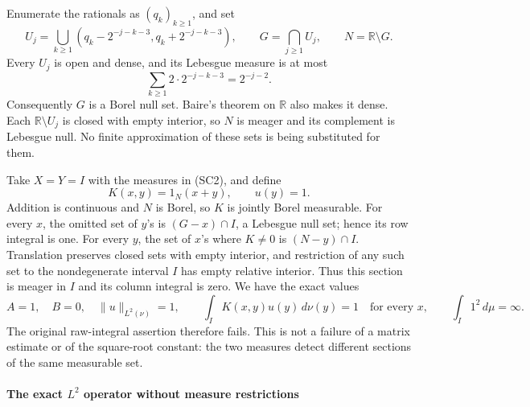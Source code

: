 \documentclass[
  11pt,
]{article}
\begin{document}
Enumerate the rationals as \((q_k)_{k\geq1}\), and set \[
 U_j=\bigcup_{k\geq1}
 (q_k-2^{-j-k-3},q_k+2^{-j-k-3}),\qquad
 G=\bigcap_{j\geq1}U_j,\qquad N=\mathbb R\setminus G .
 \tag{SC3}
\] Every \(U_j\) is open and dense, and its Lebesgue measure is at most
\[
 \sum_{k\geq1}2\cdot2^{-j-k-3}=2^{-j-2}.
 \tag{SC4}
\] Consequently \(G\) is a Borel null set. Baire's theorem on
\(\mathbb R\) also makes it dense. Each \(\mathbb R\setminus U_j\) is
closed with empty interior, so \(N\) is meager and its complement is
Lebesgue null. No finite approximation of these sets is being
substituted for them.

Take \(X=Y=I\) with the measures in (SC2), and define \[
 K(x,y)=1_N(x+y),\qquad u(y)=1 .
 \tag{SC5}
\] Addition is continuous and \(N\) is Borel, so \(K\) is jointly Borel
measurable. For every \(x\), the omitted set of \(y\)'s is
\((G-x)\cap I\), a Lebesgue null set; hence its row integral is one. For
every \(y\), the set of \(x\)'s where \(K\ne0\) is \((N-y)\cap I\).
Translation preserves closed sets with empty interior, and restriction
of any such set to the nondegenerate interval \(I\) has empty relative
interior. Thus this section is meager in \(I\) and its column integral
is zero. We have the exact values \[
 A=1,\quad B=0,\quad \|u\|_{L^2(\nu)}=1,\qquad
 \int_I K(x,y)u(y)\,d\nu(y)=1\quad\text{for every }x,\qquad
 \int_I1^2\,d\mu=\infty .
 \tag{SC6}
\] The original raw-integral assertion therefore fails. This is not a
failure of a matrix estimate or of the square-root constant: the two
measures detect different sections of the same measurable set.

\paragraph{\texorpdfstring{The exact \(L^2\) operator without measure
restrictions}{The exact L\^{}2 operator without measure restrictions}}\label{the-exact-l2-operator-without-measure-restrictions}
\end{document}
